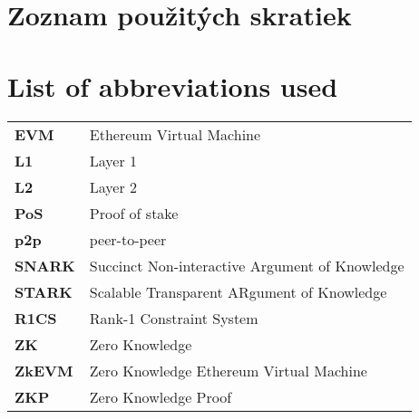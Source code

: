 \thispagestyle{plain}

\ifx\FIITlagEN\undefined
    \section*{\Huge Zoznam použitých skratiek}
\else
    \section*{\Huge List of abbreviations used}
\fi
\vskip 1cm

\begin{tabular}{ >{\bfseries}m{2cm} m{10cm} }
	EVM & Ethereum Virtual Machine 							\\
	L1 	& Layer 1 											\\
	L2 	& Layer 2 											\\
	PoS & Proof of stake 									\\
	p2p & peer-to-peer 										\\
	SNARK & Succinct Non-interactive Argument of Knowledge 	\\
	STARK & Scalable Transparent ARgument of Knowledge 		\\
	R1CS & Rank-1 Constraint System 						\\
	ZK  & Zero Knowledge           							\\
	ZkEVM  & Zero Knowledge Ethereum Virtual Machine   		\\
	ZKP & Zero Knowledge Proof
\end{tabular}

\emptypage
